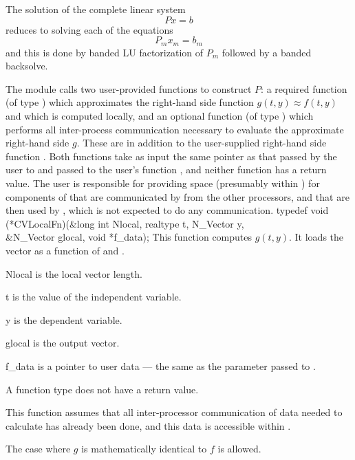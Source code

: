 The solution of the complete linear system
\begin{equation}
  Px = b
\end{equation}
reduces to solving each of the equations 
\begin{equation}
  P_m x_m = b_m
\end{equation}
and this is done by banded LU factorization of $P_m$ followed by a banded
backsolve.

The {\cvbbdpre} module calls two user-provided functions to construct $P$: 
a required function  (of type ) which approximates
the right-hand side function $g(t,y) \approx f(t,y)$ and which is computed
locally, and an optional function  (of type ) which performs 
all inter-process communication necessary to evaluate the approximate right-hand
side $g$.  These are in addition to the user-supplied right-hand side function
.  Both functions take as input the same pointer  as that passed
by the user to  and passed to the user's function ,
and neither function has a return value. The user is responsible for
providing space (presumably within ) for components of 
that are communicated by  from the other processors, and that are
then used by , which is not expected to do any communication.
{
  typedef void (*CVLocalFn)(&long int Nlocal, realtype t, N\_Vector y, \\
                            &N\_Vector glocal, void *f\_data);
}
{
  This function computes $g(t,y)$. It loads the vector
   as a function of  and .  
}
{
  \begin{args}[Nlocal]
  \item[Nlocal] 
    is the local vector length.
  \item[t]
    is the value of the independent variable.
  \item[y]
    is the dependent variable. 
  \item[glocal]
    is the output vector.
  \item[f\_data]
    is a pointer to user data --- the same as the       
    parameter passed to .  
  \end{args}
}
{
  A  function type does not have a return value.
}
{
  This function assumes that all inter-processor communication of data needed to 
  calculate  has already been done, and this data is accessible within
  .

  The case where $g$ is mathematically identical to $f$ is allowed.
}

